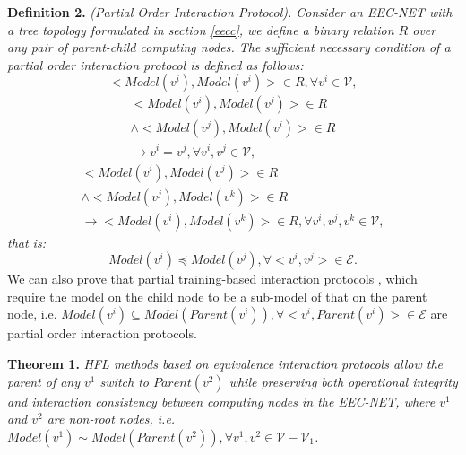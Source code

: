 \documentclass[10pt,journal]{IEEEtran}
\begin{document}
\noindent
\textbf{Definition 2.} \textit{(Partial Order Interaction Protocol). 
Consider an EEC-NET with a tree topology formulated in section \ref{eecc}, we define a binary relation $R$ over any pair of parent-child computing nodes.
The sufficient necessary condition of a partial order interaction protocol is defined as follows:}
\begin{equation}
    <Model(v^i),Model(v^i)> \in R,\forall{v^i} \in \mathcal{V},
\end{equation}
\begin{equation}
\begin{array}{l}
 < Model({v^i}),Model({v^j}) >  \in R\\
 \wedge  < Model({v^j}),Model({v^i}) >  \in R\\
 \to {v^i} = {v^j},\forall {v^i},{v^j} \in \mathcal{V},
\end{array}
\end{equation}
\begin{equation}
    \begin{array}{l}
 < Model({v^i}),Model({v^j}) >  \in R\\
 \wedge  < Model({v^j}),Model({v^k}) >  \in R\\
 \to  < Model({v^i}),Model({v^k}) >  \in R,\forall {v^i},{v^j},{v^k} \in \mathcal{V},
\end{array}
\end{equation}
\textit{that is:}
\begin{equation}
   Model(v^i) \preceq Model(v^j),\forall <v^i,v^j>\in \mathcal{E}.
\end{equation}
We can also prove that partial training-based interaction protocols \cite{alam2022fedrolex,nguyen2023feddct}, which require the model on the child node to be a sub-model of that on the parent node, i.e. $Model({v^i}) \subseteq Model(Parent({v^i})),\forall  < {v^i},Parent({v^i}) >  \in \mathcal{E}$ are partial order interaction protocols.


\noindent
\textbf{Theorem 1.} \textit{HFL methods based on equivalence interaction protocols allow the parent of any $v^1$ switch to $Parent(v^2)$ while preserving both operational integrity and interaction consistency between computing nodes in the EEC-NET, where $v^1$ and $v^2$ are non-root nodes, i.e. $Model({v^1}) \sim Model(Parent({v^2})),\forall {v^1},{v^2} \in \mathcal{V}- \mathcal{V}_1$.}
\end{document}
